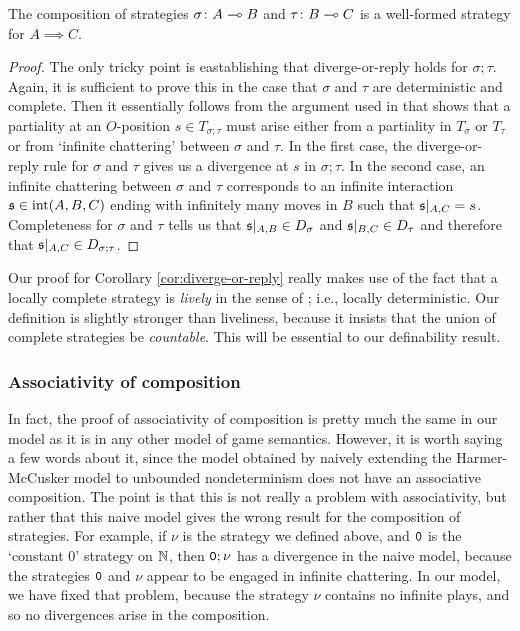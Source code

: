 \documentclass[sigplan,10pt,review]{acmart}\settopmatter{printfolios=true,printccs=false,printacmref=false}
\begin{document}
\begin{corollary}
  The composition of strategies $\sigma\colon A\multimap B$ and $\tau\colon B \multimap C$ is a well-formed strategy for $A\implies C$.
  \label{cor:diverge-or-reply}
\end{corollary}
\begin{proof}
  The only tricky point is eastablishing that diverge-or-reply holds for $\sigma;\tau$.  
  Again, it is sufficient to prove this in the case that $\sigma$ and $\tau$ are deterministic and complete.
  Then it essentially follows from the argument used in \cite{abramskyjagadeesangames} that shows that a partiality at an $O$-position $s\in T_{\sigma;\tau}$ must arise either from a partiality in $T_\sigma$ or $T_\tau$ or from `infinite chattering' between $\sigma$ and $\tau$.  
  In the first case, the diverge-or-reply rule for $\sigma$ and $\tau$ gives us a divergence at $s$ in $\sigma;\tau$.  
  In the second case, an infinite chattering between $\sigma$ and $\tau$ corresponds to an infinite interaction $\mathfrak s\in\operatorname{int}(A,B,C)$ ending with infinitely many moves in $B$ such that $\mathfrak s\vert_{A,C}=s$. 
  Completeness for $\sigma$ and $\tau$ tells us that $\mathfrak s\vert_{A,B}\in D_\sigma$ and $\mathfrak s\vert_{B,C}\in D_\tau$ and therefore that $\mathfrak s\vert_{A,C}\in D_{\sigma;\tau}$.  
\end{proof}

Our proof for Corollary \ref{cor:diverge-or-reply} really makes use of the fact that a locally complete strategy is \emph{lively} in the sense of \cite{LevyGsInfinite}; i.e., locally deterministic.  
Our definition is slightly stronger than liveliness, because it insists that the union of complete strategies be \emph{countable}.  
This will be essential to our definability result.

\subsubsection{Associativity of composition}

In fact, the proof of associativity of composition is pretty much the same in our model as it is in any other model of game semantics.  
However, it is worth saying a few words about it, since the model obtained by naively extending the Harmer-McCusker model to unbounded nondeterminism does not have an associative composition.  
The point is that this is not really a problem with associativity, but rather that this naive model gives the wrong result for the composition of strategies.  
For example, if $\nu$ is the strategy we defined above, and ${\mathtt{0}}$ is the `constant $0$' strategy on $\mathbb{N}$, then ${\mathtt{0}};\nu$ has a divergence in the naive model, because the strategies ${\mathtt{0}}$ and $\nu$ appear to be engaged in infinite chattering.  
In our model, we have fixed that problem, because the strategy $\nu$ contains no infinite plays, and so no divergences arise in the composition.
\end{document}
